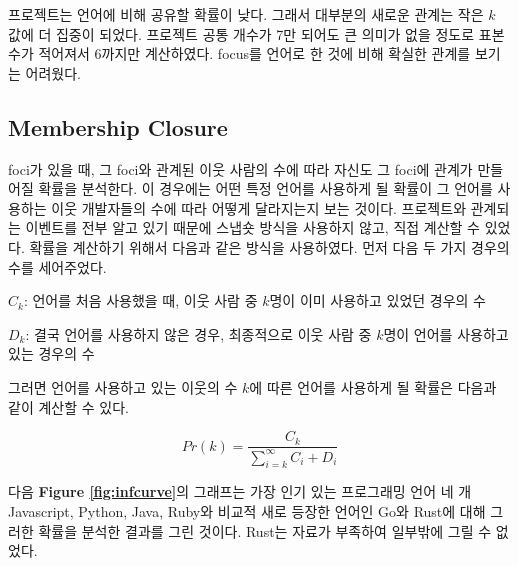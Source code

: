 \documentclass[10pt, a4paper, titlepage]{article}
\begin{document}
프로젝트는 언어에 비해 공유할 확률이 낮다. 그래서 대부분의 새로운 관계는 작은 $k$ 값에 더 집중이 되었다. 프로젝트 공통 개수가 7만 되어도 큰 의미가 없을 정도로 표본 수가 적어져서 6까지만 계산하였다. focus를 언어로 한 것에 비해 확실한 관계를 보기는 어려웠다.

\FloatBarrier


\subsection{Membership Closure}


foci가 있을 때, 그 foci와 관계된 이웃 사람의 수에 따라 자신도 그 foci에 관계가 만들어질 확률을 분석한다. 이 경우에는 어떤 특정 언어를 사용하게 될 확률이 그 언어를 사용하는 이웃 개발자들의 수에 따라 어떻게 달라지는지 보는 것이다.
프로젝트와 관계되는 이벤트를 전부 알고 있기 때문에 스냅숏 방식을 사용하지 않고, 직접 계산할 수 있었다. 확률을 계산하기 위해서 다음과 같은 방식을 사용하였다. 먼저 다음 두 가지 경우의 수를 세어주었다.



$C_k$: 언어를 처음 사용했을 때, 이웃 사람 중 $k$명이 이미 사용하고 있었던 경우의 수

$D_k$: 결국 언어를 사용하지 않은 경우, 최종적으로 이웃 사람 중 $k$명이 언어를 사용하고 있는 경우의 수

그러면 언어를 사용하고 있는 이웃의 수 $k$에 따른 언어를 사용하게 될 확률은 다음과 같이 계산할 수 있다.


$$
Pr(k) = \frac{C_k}{\sum_{i=k}^{\infty}{C_i + D_i} }
$$

다음 {\bf Figure \ref{fig:infcurve}}의 그래프는 가장 인기 있는 프로그래밍 언어 네 개 Javascript, Python, Java, Ruby와 비교적 새로 등장한 언어인 Go와 Rust에 대해 그러한 확률을 분석한 결과를 그린 것이다. Rust는 자료가 부족하여 일부밖에 그릴 수 없었다.
\end{document}
